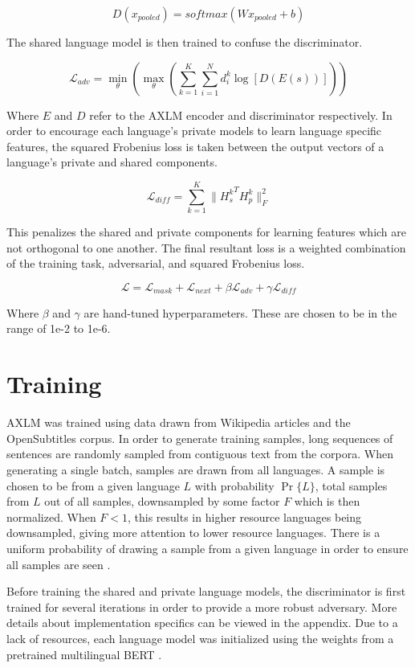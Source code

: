 \documentclass[10pt,letterpaper]{article}
\begin{document}
\begin{multicols}{2}
$$D(x_{pooled}) = softmax(W x_{pooled} + b)$$

The shared language model is then trained to confuse the discriminator.

$$\mathcal{L}_{adv} = \min_\theta \left( \max_\theta ( \sum_{k=1}^K \sum_{i=1}^N d_i^k \log [D(E(s))] ) \right)$$

Where $E$ and $D$ refer to the AXLM encoder and discriminator respectively.  In order to encourage each language's private models to learn language specific features, the squared Frobenius loss is taken between the output vectors of a language's private and shared components.

$$\mathcal{L}_{diff} = \sum_{k=1}^K \lVert {H_s^k}^T H_p^k \rVert_F^2$$

This penalizes the shared and private components for learning features which are not orthogonal to one another.  The final resultant loss is a weighted combination of the training task, adversarial, and squared Frobenius loss.

$$\mathcal{L} = \mathcal{L}_{mask} + \mathcal{L}_{next} + \beta \mathcal{L}_{adv} + \gamma \mathcal{L}_{diff}$$

Where $\beta$ and $\gamma$ are hand-tuned hyperparameters.  These are chosen to be in the range of 1e-2 to 1e-6.

\section{Training}
AXLM was trained using data drawn from Wikipedia articles and the OpenSubtitles corpus.  In order to generate training samples, long sequences of sentences are randomly sampled from contiguous text from the corpora.  When generating a single batch, samples are drawn from all languages.  A sample is chosen to be from a given language $L$ with probability $\Pr\{L\}$, total samples from $L$ out of all samples, downsampled by some factor $F$ which is then normalized.  When $F < 1$, this results in higher resource languages being downsampled, giving more attention to lower resource languages.  There is a uniform probability of drawing a sample from a given language in order to ensure all samples are seen \cite{}.

Before training the shared and private language models, the discriminator is first trained for several iterations in order to provide a more robust adversary.  More details about implementation specifics can be viewed in the appendix.  Due to a lack of resources, each language model was initialized using the weights from a pretrained multilingual BERT \cite{}.


\end{multicols}
\end{document}

